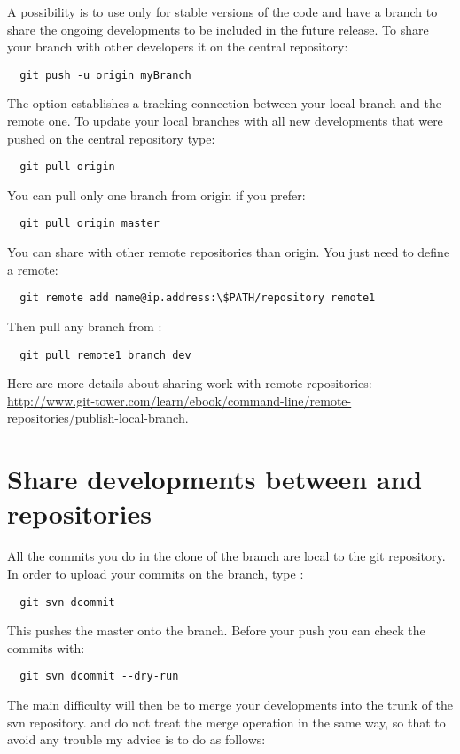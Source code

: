 A possibility is to use  only for stable versions of the code and have a  branch to share the ongoing developments to be included in the future release.
To share your branch  with other developers  it on the central repository:
\begin{lstlisting}
  git push -u origin myBranch
\end{lstlisting}
The  option establishes a tracking connection between your local branch and the remote one.
To update your local branches with all new developments that were pushed on the central repository type:
\begin{lstlisting}
  git pull origin
\end{lstlisting}
You can pull only one branch from origin if you prefer:
\begin{lstlisting}
  git pull origin master
\end{lstlisting}

You can share with other remote repositories than origin.
You just need to define a remote:
\begin{lstlisting}
  git remote add name@ip.address:\$PATH/repository remote1
\end{lstlisting}%
Then pull any branch from :
\begin{lstlisting}
  git pull remote1 branch_dev
\end{lstlisting}

Here are more details about sharing work with remote repositories:
\url{http://www.git-tower.com/learn/ebook/command-line/remote-repositories/publish-local-branch}.

\section{Share developments between  and  repositories}\label{sec:gitsvn}
All the commits you do in the  clone of the  branch are local to the git repository.
In order to upload your commits on the  branch, type :
\begin{lstlisting}
  git svn dcommit
\end{lstlisting}
This pushes the master onto the  branch. Before your push you can check the commits with:
\begin{lstlisting}
  git svn dcommit --dry-run
\end{lstlisting}

The main difficulty will then be to merge your developments into the trunk of the svn repository.
 and  do not treat the merge operation in the same way, so that to avoid any trouble my advice is to do as follows:\\

